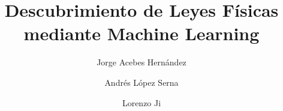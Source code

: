 \documentclass[10pt, aspectratio=169]{beamer}
\title[Inferencia Simbólica de Leyes Físicas]%
      {Descubrimiento de Leyes Físicas mediante Machine Learning}
\author[J. Acebes \and A. López \and L. Ji]%
       {\large Jorge Acebes Hernández \and Andrés López Serna \and Lorenzo Ji}
\institute[UAM]{\normalsize Universidad Autónoma de Madrid \\ Grado en Física}
\date{\ }
\begin{document}

\frame{\titlepage}






\end{document}
